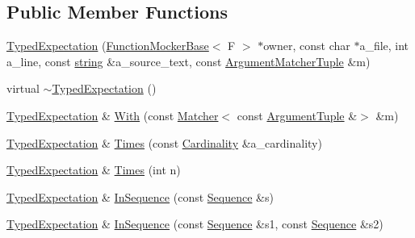 \subsection*{Public Member Functions}
\begin{DoxyCompactItemize}
\item 
\hyperlink{classtesting_1_1internal_1_1_typed_expectation_a10bd0a8fa0db37215be42e1c61ccbc28}{Typed\+Expectation} (\hyperlink{classtesting_1_1internal_1_1_function_mocker_base}{Function\+Mocker\+Base}$<$ F $>$ $\ast$owner, const char $\ast$a\+\_\+file, int a\+\_\+line, const \hyperlink{namespacetesting_1_1internal_a8e8ff5b11e64078831112677156cb111}{string} \&a\+\_\+source\+\_\+text, const \hyperlink{classtesting_1_1internal_1_1_typed_expectation_a8f10e3906761cc5c10fa3561c6e8938e}{Argument\+Matcher\+Tuple} \&m)
\item 
virtual \hyperlink{classtesting_1_1internal_1_1_typed_expectation_a4d73d7edd81f1b1418a33931fe728158}{$\sim$\+Typed\+Expectation} ()
\item 
\hyperlink{classtesting_1_1internal_1_1_typed_expectation}{Typed\+Expectation} \& \hyperlink{classtesting_1_1internal_1_1_typed_expectation_aa69c4f9b1f2cce49609023d7e5f65297}{With} (const \hyperlink{classtesting_1_1_matcher}{Matcher}$<$ const \hyperlink{classtesting_1_1internal_1_1_typed_expectation_a9a91379262d101f435809ba4556d14fa}{Argument\+Tuple} \&$>$ \&m)
\item 
\hyperlink{classtesting_1_1internal_1_1_typed_expectation}{Typed\+Expectation} \& \hyperlink{classtesting_1_1internal_1_1_typed_expectation_a9a4c34ee5c6e6adc880a22f61f33da57}{Times} (const \hyperlink{classtesting_1_1_cardinality}{Cardinality} \&a\+\_\+cardinality)
\item 
\hyperlink{classtesting_1_1internal_1_1_typed_expectation}{Typed\+Expectation} \& \hyperlink{classtesting_1_1internal_1_1_typed_expectation_a92d56ee785d38ec8193aed2a0fcbccf0}{Times} (int n)
\item 
\hyperlink{classtesting_1_1internal_1_1_typed_expectation}{Typed\+Expectation} \& \hyperlink{classtesting_1_1internal_1_1_typed_expectation_ada9e9081a98435991310ac60483d1230}{In\+Sequence} (const \hyperlink{classtesting_1_1_sequence}{Sequence} \&s)
\item 
\hyperlink{classtesting_1_1internal_1_1_typed_expectation}{Typed\+Expectation} \& \hyperlink{classtesting_1_1internal_1_1_typed_expectation_ac0f45c73e3f816796f6c5dea2dc70131}{In\+Sequence} (const \hyperlink{classtesting_1_1_sequence}{Sequence} \&s1, const \hyperlink{classtesting_1_1_sequence}{Sequence} \&s2)

\end{DoxyCompactItemize}
